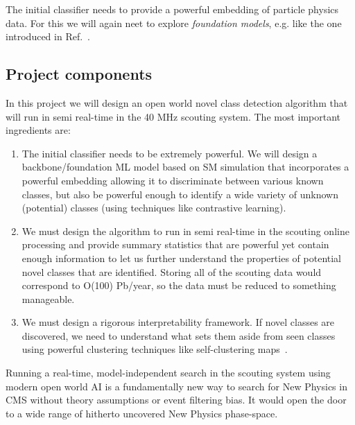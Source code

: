 \documentclass[12pt]{iopart}
\begin{document}
The initial classifier needs to provide a powerful embedding of particle physics data. For this we will again neet to explore \textit{foundation models}, e.g. like the one introduced in Ref.~\cite{foundation}.


\subsection{Project components}

In this project we will design an open world novel class detection algorithm that will run in semi real-time in the 40 MHz scouting system. The most important ingredients are:
\begin{enumerate}
    \item The initial classifier needs to be extremely powerful. We will design a backbone/foundation ML model based on SM simulation that incorporates a powerful embedding allowing it to discriminate between various known classes, but also be powerful enough to identify a wide variety of unknown (potential) classes (using techniques like contrastive learning).
    \item We must design the algorithm to run in semi real-time in the scouting online processing and provide summary statistics that are powerful yet contain enough information to let us further understand the properties of potential novel classes that are identified. Storing all of the scouting data would correspond to O(100) Pb/year, so the data must be reduced to something manageable. 
    \item We must design a rigorous interpretability framework. If novel classes are discovered, we need to understand what sets them aside from seen classes using powerful clustering techniques like self-clustering maps~\cite{6790553}.
\end{enumerate}

Running a real-time, model-independent search in the scouting system using modern open world AI is a fundamentally new way to search for New Physics in CMS without theory assumptions or event filtering bias. It would open the door to a wide range of hitherto uncovered New Physics phase-space.
\end{document}

